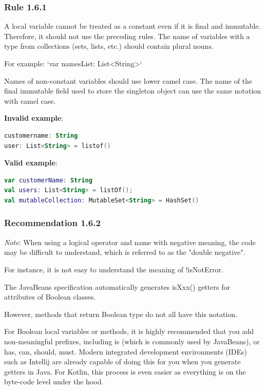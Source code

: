 \subsubsection*{\textbf{Rule 1.6.1}}
\leavevmode\newline



A local variable cannot be treated as a constant even if it is final and immutable. Therefore, it should not use the preceding rules. The name of variables with a type from collections (sets, lists, etc.) should contain plural nouns.

For example: `var namesList: List<String>`



Names of non-constant variables should use lower camel case. The name of the final immutable field used to store the singleton object can use the same notation with camel case.



\textbf{Invalid example}: 

\begin{lstlisting}[language=Kotlin]
customername: String
user: List<String> = listof()
\end{lstlisting}


\textbf{Valid example}: 

\begin{lstlisting}[language=Kotlin]
var customerName: String
val users: List<String> = listOf();
val mutableCollection: MutableSet<String> = HashSet()
\end{lstlisting}


\subsubsection*{\textbf{Recommendation 1.6.2}}
\leavevmode\newline



\textit{Note}: When using a logical operator and name with negative meaning, the code may be difficult to understand, which is referred to as the "double negative".

For instance, it is not easy to understand the meaning of !isNotError.

The JavaBeans specification automatically generates isXxx() getters for attributes of Boolean classes.

However, methods that return Boolean type do not all have this notation.

For Boolean local variables or methods, it is highly recommended that you add non-meaningful prefixes, including is (which is commonly used by JavaBeans), or has, can, should, must. Modern integrated development environments (IDEs) such as Intellij are already capable of doing this for you when you generate getters in Java. For Kotlin, this process is even easier as everything is on the byte-code level under the hood.



